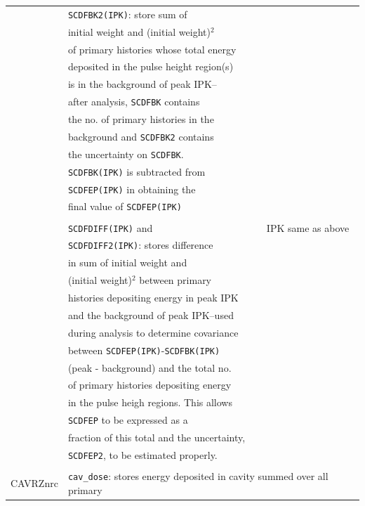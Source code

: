 \documentclass[12pt,twoside]{article}  %
\begin{document}
\begin{longtable}{lll}
          & {\tt SCDFBK2(IPK)}: store sum of&\\
          & initial weight and (initial weight)$^2$ &\\
          & of primary histories whose total energy&\\
          & deposited in the pulse height region(s)&\\
          & is in the background of peak IPK--&\\
          & after analysis, {\tt SCDFBK} contains&\\
          & the no. of primary histories in the&\\
          & background and {\tt SCDFBK2} contains&\\
          & the uncertainty on {\tt SCDFBK}.  &\\
          & {\tt SCDFBK(IPK)} is subtracted from&\\
          & {\tt SCDFEP(IPK)} in obtaining the &\\
          & final value of {\tt SCDFEP(IPK)}&\\
          &&\\
          & {\tt SCDFDIFF(IPK)} and & IPK same as above\\
          & {\tt SCDFDIFF2(IPK)}: stores difference&\\
          & in sum of initial weight and &\\
          & (initial weight)$^2$ between primary&\\
          & histories depositing energy in peak IPK&\\
          & and the background of peak IPK--used&\\
          & during analysis to determine covariance&\\
          & between {\tt SCDFEP(IPK)}-{\tt SCDFBK(IPK)}&\\
          & (peak - background) and the total no.&\\
          & of primary histories depositing energy&\\
          & in the pulse heigh regions.  This allows&\\
          & {\tt SCDFEP} to be expressed as a&\\
          & fraction of this total and the uncertainty,&\\
          & {\tt SCDFEP2}, to be estimated properly.&\\
          &                                  &\\
CAVRZnrc  & \multicolumn{2}{l}{{\tt cav\_dose}: stores energy deposited in cavity summed over all primary}\\

\end{longtable}
\end{document}

